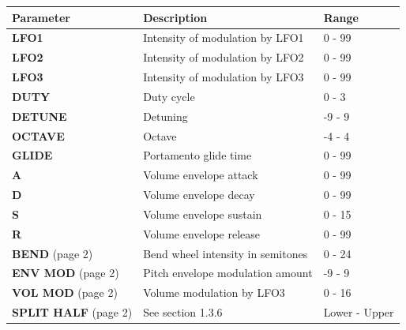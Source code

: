\documentclass[a4paper, 12p, titlepaget]{book}
\begin{document}

\begin{tabular}{l | l | l}
  Parameter & Description & Range\\ \hline
  \textbf{LFO1} & Intensity of modulation by LFO1 & 0 - 99\\
  \textbf{LFO2} & Intensity of modulation by LFO2 & 0 - 99\\
  \textbf{LFO3} & Intensity of modulation by LFO3 & 0 - 99\\
  \textbf{DUTY} & Duty cycle & 0 - 3\\
  \textbf{DETUNE} & Detuning & -9 - 9\\
  \textbf{OCTAVE} & Octave & -4 - 4\\
  \textbf{GLIDE} & Portamento glide time & 0 - 99\\
  \textbf{A} & Volume envelope attack & 0 - 99\\
  \textbf{D} & Volume envelope decay & 0 - 99\\
  \textbf{S} & Volume envelope sustain & 0 - 15\\
  \textbf{R} & Volume envelope release & 0 - 99\\
  \textbf{BEND} (page 2) & Bend wheel intensity in semitones & 0 - 24\\
  \textbf{ENV MOD} (page 2) & Pitch envelope modulation amount & -9 - 9\\
  \textbf{VOL MOD} (page 2) & Volume modulation by LFO3 & 0 - 16\\
  \textbf{SPLIT HALF} (page 2) & See section 1.3.6 & Lower - Upper\\
\end{tabular}
\end{document}
